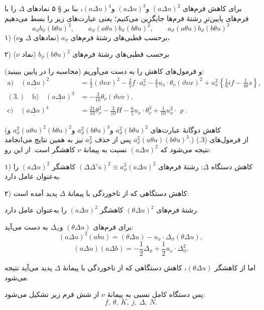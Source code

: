 \documentclass[11pt]{article}
\providecommand{\A}{\Delta}
\begin{document}
برای کاهش فرم‌های $(a\Delta u)^2$ و$(a\Delta u)^3$ و$(a\Delta u)^4$، بنا بر § ۵ نمادهای $\Delta$ را با فرم‌های پایین‌ترِ رشتهٔ فرم‌ها جایگزین می‌کنیم؛ یعنی عبارت‌های زیر را بسط می‌دهیم
\[
a_\vartheta b_\vartheta(b\theta u)^2,
\qquad a_\vartheta(a\theta u)b_\vartheta(b\theta u)^2,
\qquad a_\vartheta(a\theta u)b_\vartheta(b\theta u)^3
\]
۱) برحسب قطبی‌های رشتهٔ فرم‌های $a_\vartheta$ (نمادهای $\Delta$ و$\nu$)،

۲) برحسب قطبی‌های رشتهٔ فرم‌های $b_\vartheta(b\theta u)^2$ (نماد $\nu$)

و فرمول‌های کاهش را به دست می‌آوریم (محاسبه را در پایین ببینید):
\[
\begin{aligned}
\text{a)}\quad \underline{(a\Delta u)^2}
&=\frac12(\vartheta \nu x)^2-\frac25f\cdot a_\nu^2
-\frac45u_x\cdot\theta_\nu(\vartheta \nu x)^2
+u_x^2\left\{\frac16i f-\frac1{40}s\right\},\\
(3.)\quad\text{b)}\quad \underline{(a\Delta u)^3}
&=-\frac3{10}\theta_\nu(\vartheta \nu x),\\
\text{c)}\quad \underline{(a\Delta u)^4}
&=\frac{21}{10}\theta_\nu^2-\frac3{10}H
-\frac65u_x\cdot\theta_\nu^3+\frac1{10}u_x^2\cdot\varrho.
\end{aligned}
\]

(کاهش دوگانهٔ عبارت‌های $a_\vartheta^2(b\theta u)^2$ و$a_\vartheta^2(b\theta u)^3$ و$a_\vartheta^2(a\theta u)^2(b\theta u)^2$ و$a_\vartheta^2(a\theta u)(b\theta u)^3$ پس از حذف $a_\vartheta^2$ نیز به همین نتایج می‌انجامد.)
از فرمول‌های (3.) نتیجه می‌شود که $(a\Delta u)^2$ نسبت به پیمانهٔ $\nu$ کاهشگر است. از این رو:

۱) کاهش دستگاه $\Delta$: رشتهٔ فرم‌های $(\Delta\Delta' u)^2\equiv a_\vartheta^2(a\Delta u)^2$ کاهشگر $(a\Delta u)^2$ را به‌عنوان عامل دارد.

۲) کاهش دستگاهی که از تاخوردگی با پیمانهٔ $\Delta$ پدید آمده است:

رشتهٔ فرم‌های $(\theta\Delta u)^2$ کاهشگر $(a\Delta u)^2$ را به‌عنوان عامل دارد.

برای فرم‌های $(\theta\Delta u)$ و$\Delta_\vartheta$ به دست می‌آید:
\[
(a\Delta u)^2(abu)=(\theta\Delta u)-u_x\cdot\Delta_\vartheta(\theta\Delta u),
\]
\[
(a\Delta u)(a\Delta b)=-\frac12\Delta_\vartheta+\frac12u_x\cdot\Delta_\vartheta^2.
\]

اما از کاهشگر $(\theta\Delta u)$، کاهش دستگاهی که از تاخوردگی با پیمانهٔ $\Delta$ پدید می‌آید نتیجه می‌شود.

\bigskip

پس دستگاه کامل نسبی به پیمانهٔ $\nu$ از شش فرم زیر تشکیل می‌شود:
\[
f,\ \theta,\ K,\ j,\ \A,\ N.
\]
\end{document}
